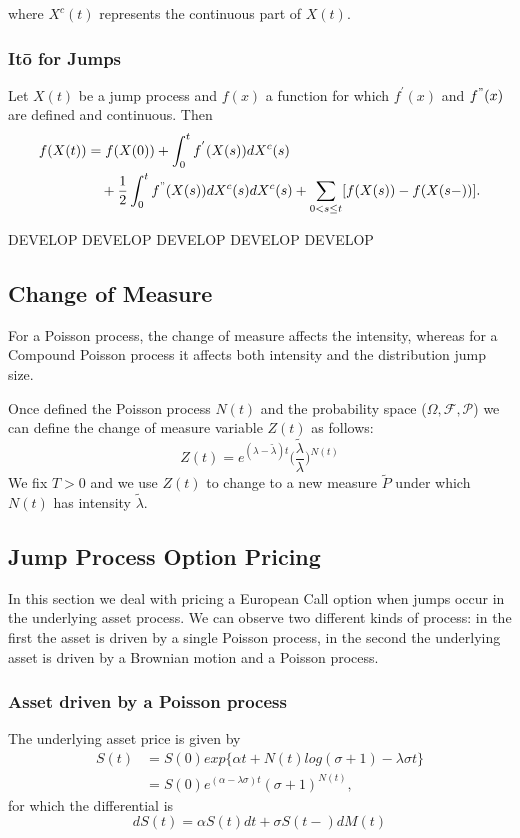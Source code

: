 \documentclass[paper=a4, fontsize=12pt]{scrartcl} %
\numberwithin{equation}{section}
\begin{document}
where $X^c(t)$ represents the continuous part of $X(t)$.

\subsubsection{It\={o} for Jumps}

Let $X(t)$ be a jump process and $f(x)$ a function for which $f^{'}(x)$ and $f^"(x)$ are defined and continuous. Then
	\begin{align*}
		f(X(t)) &= f(X(0)) + \int_0^t f^{'}(X(s))dX^c(s) \\ 
		&\quad + \frac{1}{2} \int_0^t f^{"}(X(s)) dX^c(s) dX^c(s) + \sum_{0<s\leq t} [f(X(s)) - f(X(s-))].
	\end{align*}

DEVELOP DEVELOP DEVELOP DEVELOP DEVELOP 


\subsection{Change of Measure}
For a Poisson process, the change of measure affects the intensity, whereas for a Compound Poisson process it affects both intensity and the distribution jump size. \par
Once defined the Poisson process $N(t)$ and the probability space ($\Omega, \mathcal{F}, \mathcal{P}$) we can define the change of measure variable $Z(t)$ as follows:
	\begin{equation}
		Z(t) = e^{(\lambda - \widetilde\lambda)t} \bigg(\frac{\widetilde\lambda}{\lambda} \bigg)^{N(t)}
	\end{equation}
We fix $T >0 $ and we use $Z(t)$ to change to a new measure $\widetilde{P}$ under which $N(t)$ has intensity $\widetilde\lambda$.

\subsection{Jump Process Option Pricing}
In this section we deal with pricing a European Call option when jumps occur in the underlying asset process. We can observe two different kinds of process: in the first the asset is driven by a single Poisson process, in the second the underlying asset is driven by a Brownian motion and a Poisson process.
	
\subsubsection{Asset driven by a Poisson process}
The underlying asset price is given by
		\begin{equation}
		\begin{aligned}
			S(t) &= S(0)exp\{\alpha t + N(t) log(\sigma + 1) - \lambda \sigma t\} \\
			       &= S(0) e^{(\alpha - \lambda \sigma)t} (\sigma + 1)^{N(t)},
		\end{aligned}
		\end{equation}
for which the differential is
		\begin{equation}
			dS(t) = \alpha S(t) dt + \sigma S(t-) dM(t)
		\end{equation}
		
\end{document}
